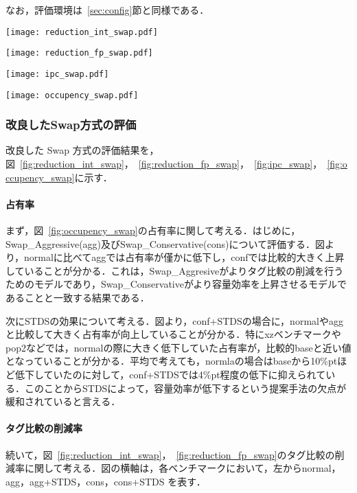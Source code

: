 \documentclass[twocolumn]{jsarticle}
\begin{document}
  なお，評価環境は~\ref{sec:config}節と同様である．

  \begin{figure*}[ht]
    \centering
    \texttt{[image: reduction\_int\_swap.pdf]}
    \caption{Swap 方式による比較器の動作回数削減率(int系)}
    \label{fig:reduction_int_swap}

    \texttt{[image: reduction\_fp\_swap.pdf]}
    \caption{Swap 方式による比較器の動作回数削減率(fp系)}
    \label{fig:reduction_fp_swap}
    
    \texttt{[image: ipc\_swap.pdf]}
    \caption{Swap 方式による IPC の変化}
    \label{fig:ipc_swap}

    \texttt{[image: occupency\_swap.pdf]}
    \caption{Swap 方式での IQ の占有率}
    \label{fig:occupency_swap}
  \end{figure*}

  \subsubsection{改良したSwap方式の評価}
  改良した Swap 方式の評価結果を，図~\ref{fig:reduction_int_swap}，~\ref{fig:reduction_fp_swap}，~\ref{fig:ipc_swap}，~\ref{fig:occupency_swap}に示す．
  \paragraph{占有率}
  まず，図~\ref{fig:occupency_swap}の占有率に関して考える．はじめに，Swap\_Aggressive(agg)及びSwap\_Conservative(cons)について評価する．図より，normalに比べてaggでは占有率が僅かに低下し，confでは比較的大きく上昇していることが分かる．これは，Swap\_Aggresiveがよりタグ比較の削減を行うためのモデルであり，Swap\_Conservativeがより容量効率を上昇させるモデルであることと一致する結果である．
  
  次にSTDSの効果について考える．図より，conf+STDSの場合に，normalやaggと比較して大きく占有率が向上していることが分かる．特にxzベンチマークやpop2などでは，normalの際に大きく低下していた占有率が，比較的baseと近い値となっていることが分かる．平均で考えても，normlaの場合はbaseから10\%ptほど低下していたのに対して，conf+STDSでは4\%pt程度の低下に抑えられている．このことからSTDSによって，容量効率が低下するという提案手法の欠点が緩和されていると言える．

  \paragraph{タグ比較の削減率}
  続いて，図~\ref{fig:reduction_int_swap}，~\ref{fig:reduction_fp_swap}のタグ比較の削減率に関して考える．図の横軸は，各ベンチマークにおいて，左からnormal，agg，agg+STDS，cons，cons+STDS を表す．
  
\end{document}

